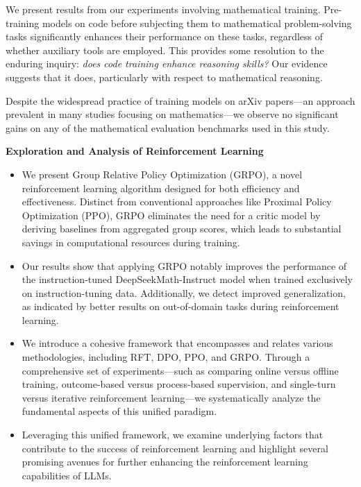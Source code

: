 \item We present results from our experiments involving mathematical training. Pre-training models on code before subjecting them to mathematical problem-solving tasks significantly enhances their performance on these tasks, regardless of whether auxiliary tools are employed. This provides some resolution to the enduring inquiry: \textit{does code training enhance reasoning skills?} Our evidence suggests that it does, particularly with respect to mathematical reasoning.

\item Despite the widespread practice of training models on arXiv papers—an approach prevalent in many studies focusing on mathematics—we observe no significant gains on any of the mathematical evaluation benchmarks used in this study.

\textbf{Exploration and Analysis of Reinforcement Learning}

\begin{itemize}[topsep=0pt]
    \item We present Group Relative Policy Optimization (GRPO), a novel reinforcement learning algorithm designed for both efficiency and effectiveness. Distinct from conventional approaches like Proximal Policy Optimization (PPO), GRPO eliminates the need for a critic model by deriving baselines from aggregated group scores, which leads to substantial savings in computational resources during training.
    \item Our results show that applying GRPO notably improves the performance of the instruction-tuned DeepSeekMath-Instruct model when trained exclusively on instruction-tuning data. Additionally, we detect improved generalization, as indicated by better results on out-of-domain tasks during reinforcement learning.
    \item We introduce a cohesive framework that encompasses and relates various methodologies, including RFT, DPO, PPO, and GRPO. Through a comprehensive set of experiments—such as comparing online versus offline training, outcome-based versus process-based supervision, and single-turn versus iterative reinforcement learning—we systematically analyze the fundamental aspects of this unified paradigm.
    \item Leveraging this unified framework, we examine underlying factors that contribute to the success of reinforcement learning and highlight several promising avenues for further enhancing the reinforcement learning capabilities of LLMs.
\end{itemize}

